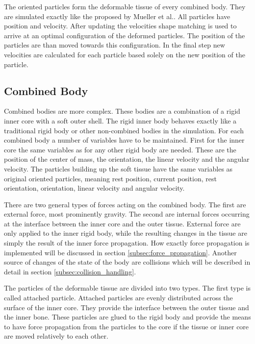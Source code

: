 The oriented particles form the deformable tissue of every combined body. They are simulated exactly like the proposed by Mueller et al.. All particles have position and velocity. After updating the velocities shape matching is used to arrive at an optimal configuration of the deformed particles. The position of the particles are than moved towards this configuration. In the final step new velocities are calculated for each particle based solely on the new position of the particle.

\subsection{Combined Body}
\label{subsec:combined_body}
Combined bodies are more complex. These bodies are a combination of a rigid inner core with a soft outer shell. The rigid inner body behaves exactly like a traditional rigid body or other non-combined bodies in the simulation. For each combined body a number of variables have to be maintained. First for the inner core the same variables as for any other rigid body are needed. These are the position of the center of mass, the orientation, the linear velocity and the angular velocity. The particles building up the soft tissue have the same variables as original oriented particles, meaning rest position, current position, rest orientation, orientation, linear velocity and angular velocity.

There are two general types of forces acting on the combined body. The first are external force, most prominently gravity. The second are internal forces occurring at the interface between the inner core and the outer tissue. External force are only applied to the inner rigid body, while the resulting changes in the tissue are simply the result of the inner force propagation. How exactly force propagation is implemented will be discussed in section \ref{subsec:force_propagation}. Another source of changes of the state of the body are collisions which will be described in detail in section \ref{subsec:collision_handling}.

The particles of the deformable tissue are divided into two types. The first type is called attached particle. Attached particles are evenly distributed across the surface of the inner core. They provide the interface between the outer tissue and the inner bone. These particles are glued to the rigid body and provide the means to have force propagation from the particles to the core if the tissue or inner core are moved relatively to each other.

